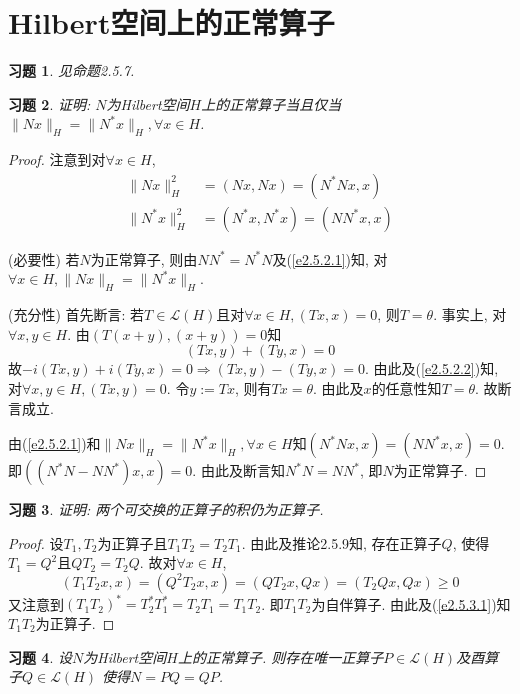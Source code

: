 \documentclass[UTF8,twoside]{ctexbook}
\newtheorem{exercise}{习题}[section]
\newcommand{\h}{\mathscr}
\numberwithin{equation}{section}
\begin{document}
	\section{Hilbert空间上的正常算子}
	\begin{exercise}
		见命题2.5.7.
	\end{exercise}
	\begin{exercise}
		证明: $N$为Hilbert空间$H$上的正常算子当且仅当$\|Nx\|_H=\|N^*x\|_H,\forall x\in H$.
	\end{exercise}
	\begin{proof}
		注意到对$\forall x\in H$,
		\begin{equation}
		\label{e2.5.2.1}
		\begin{aligned}
		\|Nx\|^2_H&=(Nx,Nx)=(N^*Nx,x)\\
		\|N^*x\|^2_H&=(N^*x,N^*x)=(NN^*x,x)
		\end{aligned}
		\end{equation}

		(必要性) 若$N$为正常算子, 则由$NN^*=N^*N$及(\ref{e2.5.2.1})知, 对$\forall x\in H,\|Nx\|_H=\|N^*x\|_H$.

		(充分性) 首先断言: 若$T\in\h L(H)$且对$\forall x\in H,(Tx,x)=0$, 则$T=\theta$. 事实上, 对$\forall x,y\in H$. 由$(T(x+y),(x+y))=0$知
		\begin{equation}\label{e2.5.2.2}
		(Tx,y)+(Ty,x)=0
		\end{equation}
		故$-i(Tx,y)+i(Ty,x)=0\Rightarrow (Tx,y)-(Ty,x)=0$. 由此及(\ref{e2.5.2.2})知, 对$\forall x,y\in H, (Tx,y)=0$. 令$y:=Tx$, 则有$Tx=\theta$. 由此及$x$的任意性知$T=\theta$. 故断言成立.

		由(\ref{e2.5.2.1})和$\|Nx\|_H=\|N^*x\|_H,\forall x\in H$知$(N^*Nx,x)=(NN^*x,x)=0$. 即$((N^*N-NN^*)x,x)=0$. 由此及断言知$N^*N=NN^*$, 即$N$为正常算子.
	\end{proof}
	\begin{exercise}
		证明: 两个可交换的正算子的积仍为正算子.
	\end{exercise}
	\begin{proof}
		设$T_1,T_2$为正算子且$T_1T_2=T_2T_1$. 由此及推论2.5.9知, 存在正算子$Q$, 使得$T_1=Q^2$且$QT_2=T_2Q$. 故对$\forall x\in H$,
		\begin{equation}\label{e2.5.3.1}
		(T_1T_2x,x)=(Q^2T_2x,x)=(QT_2x,Qx)=(T_2Qx,Qx)\geq 0
		\end{equation}
		又注意到$(T_1T_2)^*=T_2^*T_1^*=T_2T_1=T_1T_2$. 即$T_1T_2$为自伴算子. 由此及(\ref{e2.5.3.1})知$T_1T_2$为正算子.
	\end{proof}
	\begin{exercise}
		设$N$为Hilbert空间$H$上的正常算子. 则存在唯一正算子$P\in\h L(H)$及酉算子$Q\in\h L(H)$ 使得$N=PQ=QP$.
	\end{exercise}
\end{document}
